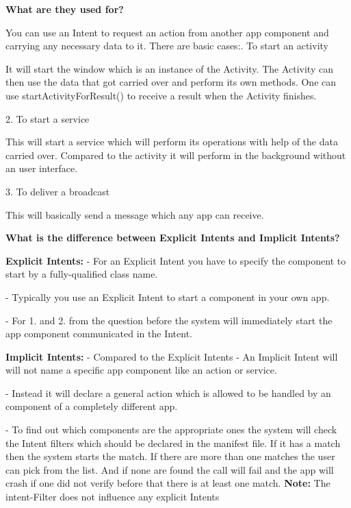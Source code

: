 \documentclass[11pt]{article}
\begin{document}
\textbf{What are they used for? }

You can use an Intent to request an action from another app component and carrying any necessary data to it.
There are basic cases:. To start an activity
	
It will start the window which is an instance of the Activity. 
The Activity can then use the data that got carried over and perform its own methods.
One can use startActivityForResult() to receive a result when the Activity finishes.
 
2. To start a service

This will start a service which will perform its operations with help of the data carried over.
Compared to the activity it will perform in the background without an user interface.

3. To deliver a broadcast

This will basically send a message which any app can receive.

\textbf {What is the difference between Explicit Intents and Implicit Intents?}

\textbf{Explicit Intents:}\newline
- For an Explicit Intent you have to specify the component to start by a fully-qualified class name.

- Typically you use an Explicit Intent to start a component in your own app.

- For 1. and 2. from the question before the system will immediately start the app component communicated in the Intent.

\textbf{Implicit Intents:}\newline
- Compared to the Explicit Intents - An Implicit Intent will will not name a specific app component like an action or service.

- Instead it will declare a general action which is allowed to be handled by an component of    a completely different app. 	

- To find out which components are the appropriate ones the system will check the Intent filters which should be declared in the manifest file.
If it has a match then the system starts the match. If there are more than one matches the user can pick from the list.
And if none are found the call will fail and the app will crash if one did not verify before that there is at least one match.\newline
\textbf{Note:} The intent-Filter does not influence any explicit Intents
\end{document}
